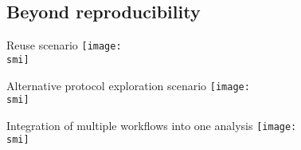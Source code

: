  \subsection{Beyond reproducibility}
  \begin{frame}{Reuse scenario}
    \def\smi{out/ln/updir/mw-gcthesis-oral/ink/reproducibility/arrow_reproducibility_exchange_data.pdf}
    \texttt{[image: \\smi]}%
  \end{frame}
  \begin{frame}{Alternative protocol exploration scenario}
    \def\smi{out/ln/updir/mw-gcthesis-oral/ink/reproducibility/arrow_reproducibility_alternative_protocol.pdf}
    \texttt{[image: \\smi]}%
  \end{frame}
  \begin{frame}{Integration of multiple workflows into one analysis}
    \def\smi{out/ln/updir/mw-gcthesis-oral/ink/reproducibility/arrow_reproducibility_integration.pdf}
    \texttt{[image: \\smi]}%
  \end{frame}
